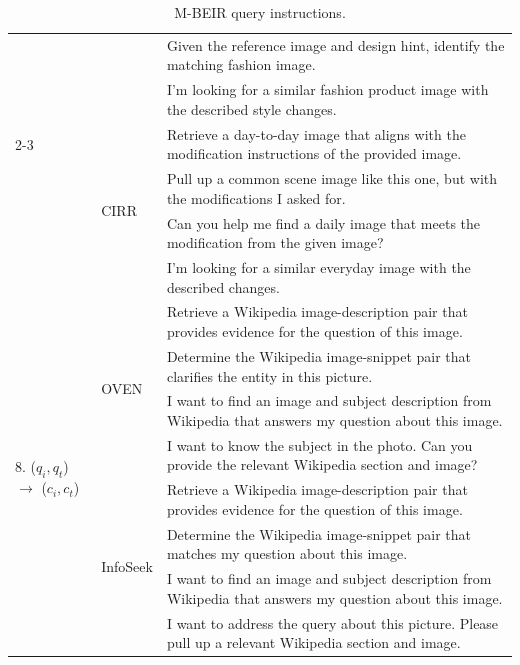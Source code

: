 \begin{table}
\begin{tabular}{l l l}
         && Given the reference image and design hint, identify the matching fashion image. \\
         && I'm looking for a similar fashion product image with the described style changes. \\
         \cmidrule(lr){2-3}
         & \multirow{4}{*}{CIRR}                & Retrieve a day-to-day image that aligns with the modification instructions of the provided image. \\
         &     & Pull up a common scene image like this one, but with the modifications I asked for. \\
         &     & Can you help me find a daily image that meets the modification from the given image? \\
         &     & I'm looking for a similar everyday image with the described changes. \\
         \midrule
         \multirow{8}{*}{8. ($q_i, q_t$) $\to$ ($c_i, c_t$)} 
         & \multirow{4}{*}{OVEN}                          & Retrieve a Wikipedia image-description pair that provides evidence for the question of this image. \\
         && Determine the Wikipedia image-snippet pair that clarifies the entity in this picture. \\
         && I want to find an image and subject description from Wikipedia that answers my question about this image. \\
         && I want to know the subject in the photo. Can you provide the relevant Wikipedia section and image? \\
         \cmidrule(lr){2-3}
         & \multirow{4}{*}{InfoSeek}                & Retrieve a Wikipedia image-description pair that provides evidence for the question of this image. \\
         &     & Determine the Wikipedia image-snippet pair that matches my question about this image. \\
         &     & I want to find an image and subject description from Wikipedia that answers my question about this image. \\
         &     & I want to address the query about this picture. Please pull up a relevant Wikipedia section and image. \\
         \bottomrule
    \end{tabular}
    \caption{M-BEIR query instructions.}
    \label{tab:instructions2}
\end{table}